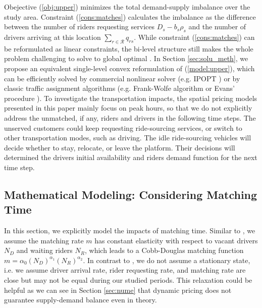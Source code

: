 \documentclass[review]{elsarticle}
\begin{document}
Obejective (\ref{obj:upper}) minimizes the total demand-supply imbalance over the study area. Constraint (\ref{cons:matches}) calculates the imbalance as the difference between the number of riders requesting services ${D}_s - b_s \rho_s$ and the number of drivers arriving at this location $\sum_{r \in \mathcal{R}}q_{rs}$. While constraint (\ref{cons:matches}) can be reformulated as linear constraints, the bi-level structure still makes the whole problem challenging to solve to global optimal \citep{yang1998models, gao2005solution, sinha2017review}. In Section \ref{sec:solu_meth}, we propose an equivalent single-level convex reformulation of (\ref{model:upper}), which can be efficiently solved by commercial nonlinear solver (e.g. IPOPT \citep{wachter2009short}) or by classic traffic assignment algorithms (e.g. Frank-Wolfe algorithm \citep{Sheffi_85} or Evans' procedure \citep{evans1976derivation}). To investigate the transportation impacts, the spatial pricing models presented in this paper mainly focus on peak hours, so that we do not explicitly address the unmatched, if any, riders and drivers in the following time steps. The unserved customers could keep requesting ride-sourcing services, or switch to other transportation modes, such as driving. The idle ride-sourcing vehicles will decide whether to stay, relocate, or leave the platform. Their decisions will determined the drivers initial availability and riders demand function for the next time step.

\subsection{Mathematical Modeling: Considering Matching Time}\label{sec:modeling_matching}

In this section, we explicitly model the impacts of matching time. Similar to \cite{zha2016economic}, we assume the matching rate $m$ has constant elasticity with respect to vacant drivers $N_D$ and waiting riders $N_R$, which leads to a Cobb-Douglas matching function $m = \alpha_0(N_D)^{\alpha_1}(N_R)^{\alpha_2}$. In contrast to \citep{zha2016economic}, we do not assume a stationary state, i.e. we assume driver arrival rate, rider requesting rate, and matching rate are close but may not be equal during our studied periods. This relaxation could be helpful as we can see in Section \ref{sec:nume} that dynamic pricing does not guarantee supply-demand balance even in theory.
\end{document}

